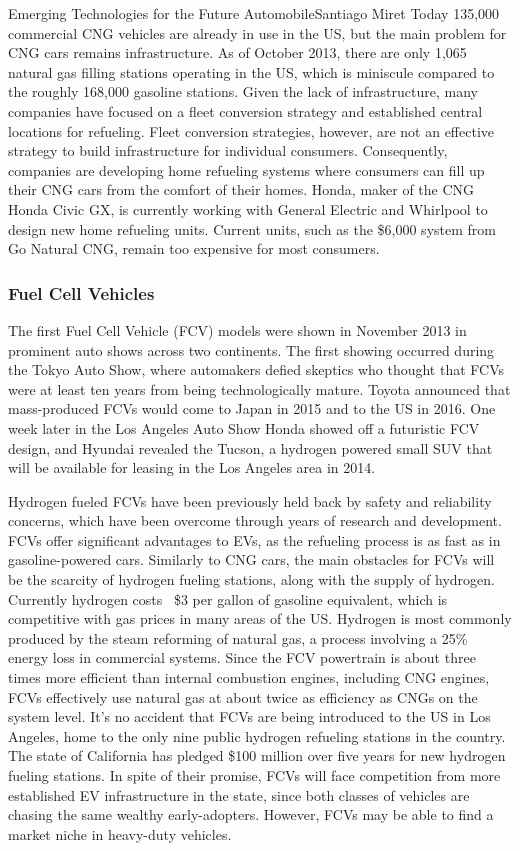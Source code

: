 \documentclass[10pt]{papertex}
\begin{document}
\begin{news}{2}{Emerging Technologies for the Future Automobile}{Santiago Miret}{}{}
Today 135,000 commercial CNG vehicles are already in use in the US, but the main
problem for CNG cars remains infrastructure. As of October 2013, there are only
1,065 natural gas filling stations operating in the US, which is miniscule
compared to the roughly 168,000 gasoline stations. Given the lack of
infrastructure, many companies have focused on a fleet conversion strategy and
established central locations for refueling. Fleet conversion strategies,
however, are not an effective strategy to build infrastructure for individual
consumers. Consequently, companies are developing home refueling systems where
consumers can fill up their CNG cars from the comfort of their homes. Honda,
maker of the CNG Honda Civic GX, is currently working with General Electric and
Whirlpool to design new home refueling units. Current units, such as the \$6,000
system from Go Natural CNG, remain too expensive for most consumers.

\subsubsection*{Fuel Cell Vehicles}

The first Fuel Cell Vehicle (FCV) models were shown in November 2013 in
prominent auto shows across two continents. The first showing occurred during
the Tokyo Auto Show, where automakers defied skeptics who thought that FCVs were
at least ten years from being technologically mature. Toyota announced that
mass-produced FCVs would come to Japan in 2015 and to the US in 2016. One week
later in the Los Angeles Auto Show Honda showed off a futuristic FCV design, and
Hyundai revealed the Tucson, a hydrogen powered small SUV that will be available
for leasing in the Los Angeles area in 2014.

Hydrogen fueled FCVs have been previously held back by safety and reliability
concerns, which have been overcome through years of research and development.
FCVs offer significant advantages to EVs, as the refueling process is as fast as
in gasoline-powered cars. Similarly to CNG cars, the main obstacles for FCVs
will be the scarcity of hydrogen fueling stations, along with the supply of
hydrogen. Currently hydrogen costs ~\$3 per gallon of gasoline equivalent, which
is competitive with gas prices in many areas of the US. Hydrogen is most
commonly produced by the steam reforming of natural gas, a process involving a
25\% energy loss in commercial systems. Since the FCV powertrain is about three
times more efficient than internal combustion engines, including CNG engines,
FCVs effectively use natural gas at about twice as efficiency as CNGs on the
system level. It's no accident that FCVs are being introduced to the US in Los
Angeles, home to the only nine public hydrogen refueling stations in the
country. The state of California has pledged \$100 million over five years for
new hydrogen fueling stations. In spite of their promise, FCVs will face
competition from more established EV infrastructure in the state, since both
classes of vehicles are chasing the same wealthy early-adopters. However, FCVs
may be able to find a market niche in heavy-duty vehicles.


\end{news}
\end{document}

